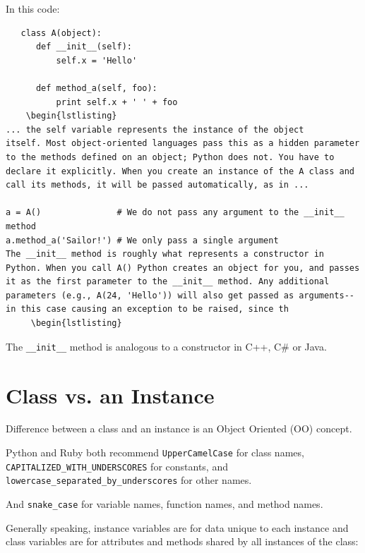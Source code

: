 \documentclass[11pt,a4paper]{article}
\begin{document}
    
    In this code:
    \begin{lstlisting}
   class A(object):
      def __init__(self):
          self.x = 'Hello'

      def method_a(self, foo):
          print self.x + ' ' + foo
    \begin{lstlisting}
... the self variable represents the instance of the object
itself. Most object-oriented languages pass this as a hidden parameter
to the methods defined on an object; Python does not. You have to
declare it explicitly. When you create an instance of the A class and
call its methods, it will be passed automatically, as in ...

a = A()               # We do not pass any argument to the __init__ method
a.method_a('Sailor!') # We only pass a single argument
The __init__ method is roughly what represents a constructor in Python. When you call A() Python creates an object for you, and passes it as the first parameter to the __init__ method. Any additional parameters (e.g., A(24, 'Hello')) will also get passed as arguments--in this case causing an exception to be raised, since th
     \begin{lstlisting}
  \end{lstlisting}


The {\tt \_\_init\_\_} method is analogous to a constructor in C++, C\#
or Java.

\section{Class vs. an Instance}
Difference between a class and an instance is an Object Oriented (OO)
concept.

Python and Ruby both recommend {\tt UpperCamelCase} for class names,
{\tt CAPITALIZED\_WITH\_UNDERSCORES} for constants, and {\tt
lowercase\_separated\_by\_underscores} for other names.  

And {\tt snake\_case} for variable names, function names, and method names. 

Generally speaking, instance variables are for data unique to each instance and class variables are for attributes and methods shared by all instances of the class:
\end{document}
